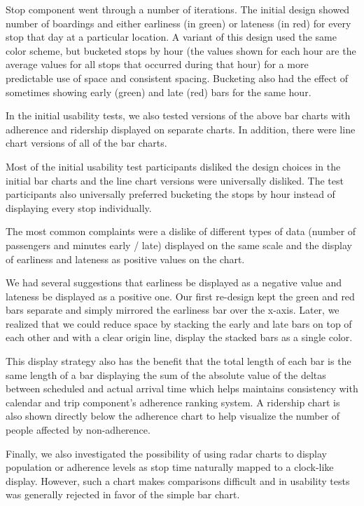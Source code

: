 \documentclass[journal]{vgtc}                %
\begin{document}
Stop component went through a number of iterations. The initial design showed number of boardings and either earliness (in green) or lateness (in red) for every stop that day at a particular location. A variant of this design used the same color scheme, but bucketed stops by hour (the values shown for each hour are the average values for all stops that occurred during that hour) for a more predictable use of space and consistent spacing. Bucketing also had the effect of sometimes showing early (green) and late (red) bars for the same hour.

In the initial usability tests, we also tested versions of the above bar charts with adherence and ridership displayed on separate charts. In addition, there were line chart versions of all of the bar charts.

Most of the initial usability test participants disliked the design choices in the initial bar charts and the line chart versions were universally disliked. The test participants also universally preferred bucketing the stops by hour instead of displaying every stop individually.

The most common complaints were a dislike of different types of data (number of passengers and minutes early / late) displayed on the same scale and the display of earliness and lateness as positive values on the chart.

We had several suggestions that earliness be displayed as a negative value and lateness be displayed as a positive one. Our first re-design kept the green and red bars separate and simply mirrored the earliness bar over the x-axis. Later, we realized that we could reduce space by stacking the early and late bars on top of each other and with a clear origin line, display the stacked bars as a single color.

This display strategy also has the benefit that the total length of each bar is the same length of a bar displaying the sum of the absolute value of the deltas between scheduled and actual arrival time which helps maintains consistency with calendar and trip component's adherence ranking system. A ridership chart is also shown directly below the adherence chart to help visualize the number of people affected by non-adherence.

Finally, we also investigated the possibility of using radar charts to display population or adherence levels as stop time naturally mapped to a clock-like display. However, such a chart makes comparisons difficult and in usability tests was generally rejected in favor of the simple bar chart.
\end{document}

